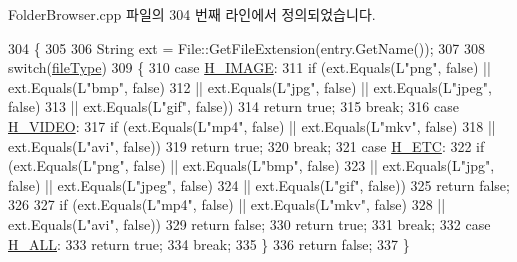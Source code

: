 Folder\+Browser.\+cpp 파일의 304 번째 라인에서 정의되었습니다.


\begin{DoxyCode}
304                                                      \{
305 
306     String ext = File::GetFileExtension(entry.GetName());
307 
308     \textcolor{keywordflow}{switch}(\hyperlink{class_folder_browser_ab240fcb3674e6887f601fd23c25477f3}{fileType})
309     \{
310     \textcolor{keywordflow}{case} \hyperlink{_folder_browser_8h_af547d73b85f475c4abfafdb76bf0c301aa6be44e52b2ea1e9671482254a70dba0}{H\_IMAGE}:
311         \textcolor{keywordflow}{if} (ext.Equals(L\textcolor{stringliteral}{"png"}, \textcolor{keyword}{false}) || ext.Equals(L\textcolor{stringliteral}{"bmp"}, \textcolor{keyword}{false})
312                     || ext.Equals(L\textcolor{stringliteral}{"jpg"}, \textcolor{keyword}{false}) || ext.Equals(L\textcolor{stringliteral}{"jpeg"}, \textcolor{keyword}{false})
313                     || ext.Equals(L\textcolor{stringliteral}{"gif"}, \textcolor{keyword}{false}))
314             \textcolor{keywordflow}{return} \textcolor{keyword}{true};
315         \textcolor{keywordflow}{break};
316     \textcolor{keywordflow}{case} \hyperlink{_folder_browser_8h_af547d73b85f475c4abfafdb76bf0c301ad8a34e0e456a91ca22a267f2f7b44651}{H\_VIDEO}:
317         \textcolor{keywordflow}{if} (ext.Equals(L\textcolor{stringliteral}{"mp4"}, \textcolor{keyword}{false}) || ext.Equals(L\textcolor{stringliteral}{"mkv"}, \textcolor{keyword}{false})
318             || ext.Equals(L\textcolor{stringliteral}{"avi"}, \textcolor{keyword}{false}))
319             \textcolor{keywordflow}{return} \textcolor{keyword}{true};
320         \textcolor{keywordflow}{break};
321     \textcolor{keywordflow}{case} \hyperlink{_folder_browser_8h_af547d73b85f475c4abfafdb76bf0c301a29999a14bbcc6a2c7eac4af5f0383c9b}{H\_ETC}:
322         \textcolor{keywordflow}{if} (ext.Equals(L\textcolor{stringliteral}{"png"}, \textcolor{keyword}{false}) || ext.Equals(L\textcolor{stringliteral}{"bmp"}, \textcolor{keyword}{false})
323                             || ext.Equals(L\textcolor{stringliteral}{"jpg"}, \textcolor{keyword}{false}) || ext.Equals(L\textcolor{stringliteral}{"jpeg"}, \textcolor{keyword}{false})
324                             || ext.Equals(L\textcolor{stringliteral}{"gif"}, \textcolor{keyword}{false}))
325             \textcolor{keywordflow}{return} \textcolor{keyword}{false};
326 
327         \textcolor{keywordflow}{if} (ext.Equals(L\textcolor{stringliteral}{"mp4"}, \textcolor{keyword}{false}) || ext.Equals(L\textcolor{stringliteral}{"mkv"}, \textcolor{keyword}{false})
328             || ext.Equals(L\textcolor{stringliteral}{"avi"}, \textcolor{keyword}{false}))
329             \textcolor{keywordflow}{return} \textcolor{keyword}{false};
330         \textcolor{keywordflow}{return} \textcolor{keyword}{true};
331         \textcolor{keywordflow}{break};
332     \textcolor{keywordflow}{case} \hyperlink{_folder_browser_8h_af547d73b85f475c4abfafdb76bf0c301aad30772cd86a5fa22262bf9c16c2eb42}{H\_ALL}:
333         \textcolor{keywordflow}{return} \textcolor{keyword}{true};
334         \textcolor{keywordflow}{break};
335     \}
336     \textcolor{keywordflow}{return} \textcolor{keyword}{false};
337 \}
\end{DoxyCode}


